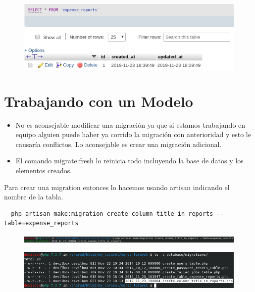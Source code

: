 \documentclass{article}
\begin{document}
\begin{figure}[h!]
  \centering
  \includegraphics[scale=0.75]{./Pictures/041_registro_expense_reports.png}
\end{figure}

\newpage

\section{Trabajando con un Modelo}%
\begin{itemize}
  \item No es aconsejable modificar una migración ya que si estamos trabajando
    en equipo alguien puede haber ya corrido la migración con anterioridad y
    esto le causaría conflictos. Lo aconsejable es crear una migración
    adicional.
  \item El comando migrate:fresh lo reinicia todo incluyendo la base de datos y
    los elementos creados.
\end{itemize}

Para crear una migration entonces lo hacemos usando artisan indicando el nombre
de la tabla.
\begin{verbatim}
  php artisan make:migration create_column_title_in_reports --table=expense_reports
\end{verbatim}

\begin{figure}[h!]
  \centering
  \includegraphics[scale=0.55]{./Pictures/040_migration_file.png}
\end{figure}

\begin{figure}[h!]
  \centering
  \includegraphics[scale=0.75]{./Pictures/042_php_migration.png}
\end{figure}
\end{document}

